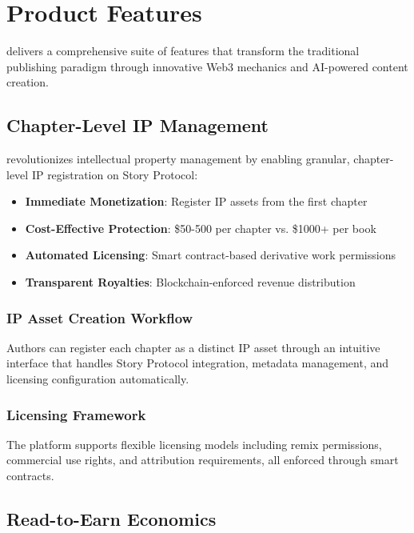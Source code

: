 \section{Product Features}
\label{sec:product-features}

\storyhouse{} delivers a comprehensive suite of features that transform the traditional publishing paradigm through innovative Web3 mechanics and AI-powered content creation.

\subsection{Chapter-Level IP Management}

\storyhouse{} revolutionizes intellectual property management by enabling granular, chapter-level IP registration on Story Protocol:

\begin{itemize}
    \item \textbf{Immediate Monetization}: Register IP assets from the first chapter
    \item \textbf{Cost-Effective Protection}: \$50-500 per chapter vs. \$1000+ per book
    \item \textbf{Automated Licensing}: Smart contract-based derivative work permissions
    \item \textbf{Transparent Royalties}: Blockchain-enforced revenue distribution
\end{itemize}

\subsubsection{IP Asset Creation Workflow}

Authors can register each chapter as a distinct IP asset through an intuitive interface that handles Story Protocol integration, metadata management, and licensing configuration automatically.

\subsubsection{Licensing Framework}

The platform supports flexible licensing models including remix permissions, commercial use rights, and attribution requirements, all enforced through smart contracts.

\subsection{Read-to-Earn Economics}

